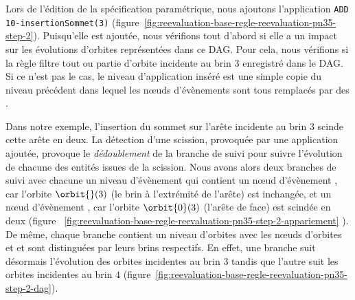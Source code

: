 Lors de l'édition de la spécification paramétrique, nous ajoutons l'application
\texttt{ADD 10-\allowbreak{}ins\-ert\-ion\-Som\-met(3)}
(figure~\ref{fig:reevaluation-base-regle-reevaluation-pn35-step-2}). %
Puisqu'elle est ajoutée, nous vérifions tout d'abord si elle a un impact sur les
évolutions d'orbites représentées dans ce DAG. %
Pour cela, nous vérifions si la règle filtre tout ou partie d'orbite incidente
au brin \(3\) enregistré dans le DAG. %
Si ce n'est pas le cas, le niveau d'application inséré est une simple copie du
niveau précédent dans lequel les n\oe uds d'évènements sont tous remplacés par
des \noeffectnodeevent{}. %

Dans notre exemple, l'insertion du sommet sur l'arête incidente au brin \(3\)
scinde cette arête en deux. %
La détection d'une scission, provoquée par une application ajoutée, provoque le
\emph{dédoublement} de la branche de suivi pour suivre l'évolution de chacune
des entités issues de la scission. %
Nous avons alors deux branches de suivi avec chacune un niveau d'évènement qui
contient un n\oe ud d'évènement \nomodifnodeevent{}, car l'orbite
\(\orbit{}(3)\) (le brin à l'extrémité de l'arête) est inchangée, et un n\oe ud
d'évènement \splitnodeevent{}, car l'orbite \(\orbit{0}(3)\) (l'arête de face)
est scindée en deux (figure~
\ref{fig:reevaluation-base-regle-reevaluation-pn35-step-2-appariement} ). %
De même, chaque branche contient un niveau d'orbites avec les n\oe uds d'orbites
\orbitnode{\orbit{}} et  et sont distinguées par leurs
brins respectifs. %
En effet, une branche suit désormais l'évolution des orbites incidentes au brin
\(3\) tandis que l'autre suit les orbites incidentes au brin \(4\)
(figure~\ref{fig:reevaluation-base-regle-reevaluation-pn35-step-2-dag}). %

